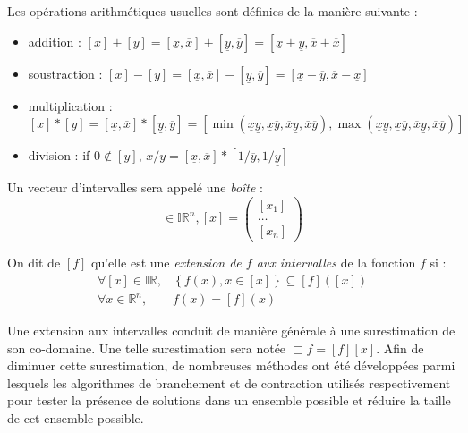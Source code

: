 Les op\'erations arithm\'etiques usuelles sont d\'efinies de la mani\`ere 
suivante :
\begin{itemize}
 \item addition : $[x]+[y] = [\underline{x},\overline{x}] + 
[\underline{y},\overline{y}] = [\underline{x} + 
\underline{y},\overline{x}+\overline{x}]$
\item soustraction : $[x]-[y] = [\underline{x},\overline{x}] - 
[\underline{y},\overline{y}] 
= [\underline{x} - \overline{y},\overline{x}-\underline{x}]$
\item multiplication : $[x]*[y] = [\underline{x},\overline{x}] * 
[\underline{y},\overline{y}] 
= [\min(\underline{x}\underline{y}, 
\underline{x}\overline{y},\overline{x}\underline{y},\overline{x}\overline{y}),
\max(\underline{x}\underline{y}, 
\underline{x}\overline{y},\overline{x}\underline{y},\overline{x}\overline{y})]$
\item division : if $0 \notin [y]$, $x/y = [\underline{x}, 
\overline{x}]*[1/\overline{y},1/\underline{y}]$ 
\end{itemize}

Un vecteur d'intervalles sera appel\'e une {\it bo\^ite} :
\begin{equation}
[x] \in \mathbb I \mathbb R^n, [x] = \begin{pmatrix}
                                      [x_1]\\
				      \dots \\
				      [x_n]
                                     \end{pmatrix}
\label{chap03:eq12}
\end{equation}

On dit de $[f]$ qu'elle est une {\it extension de $f$ aux intervalles} 
de la fonction $f$ si :
\begin{equation}
\begin{array}{ll}
\forall [x] \in \mathbb I \mathbb R, & \left \lbrace f(x), x \in [x] \right 
\rbrace \subseteq [f]([x]) \\
\forall x \in \mathbb R^n, & f(x) = [f](x) 
\end{array}
\label{chap03:eq13}
\end{equation}

Une extension aux intervalles conduit de mani\`ere g\'en\'erale \`a une 
surestimation de son co-domaine. Une telle surestimation sera not\'ee $\Box f = 
[f][x]$. Afin de diminuer cette surestimation, de nombreuses m\'ethodes ont 
\'et\'e d\'evelopp\'ees parmi lesquels les algorithmes de branchement et de 
contraction utilis\'es respectivement pour tester la pr\'esence de solutions 
dans un ensemble possible et r\'eduire la taille de cet ensemble possible.

